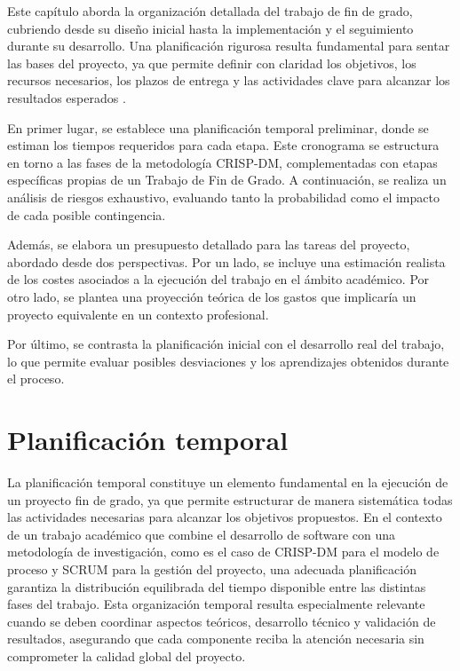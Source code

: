 Este capítulo aborda la organización detallada del trabajo de fin de grado, cubriendo desde su diseño inicial hasta la implementación y el seguimiento durante su desarrollo. Una planificación rigurosa resulta fundamental para sentar las bases del proyecto, ya que permite definir con claridad los objetivos, los recursos necesarios, los plazos de entrega y las actividades clave para alcanzar los resultados esperados \cite{pmbok}.

En primer lugar, se establece una planificación temporal preliminar, donde se estiman los tiempos requeridos para cada etapa. Este cronograma se estructura en torno a las fases de la metodología CRISP-DM, complementadas con etapas específicas propias de un Trabajo de Fin de Grado. A continuación, se realiza un análisis de riesgos exhaustivo, evaluando tanto la probabilidad como el impacto de cada posible contingencia.

Además, se elabora un presupuesto detallado para las tareas del proyecto, abordado desde dos perspectivas. Por un lado, se incluye una estimación realista de los costes asociados a la ejecución del trabajo en el ámbito académico. Por otro lado, se plantea una proyección teórica de los gastos que implicaría un proyecto equivalente en un contexto profesional.

Por último, se contrasta la planificación inicial con el desarrollo real del trabajo, lo que permite evaluar posibles desviaciones y los aprendizajes obtenidos durante el proceso.

\section{Planificación temporal}

La planificación temporal constituye un elemento fundamental en la ejecución de un proyecto fin de grado, ya que permite estructurar de manera sistemática todas las actividades necesarias para alcanzar los objetivos propuestos. En el contexto de un trabajo académico que combine el desarrollo de software con una metodología de investigación, como es el caso de CRISP-DM para el modelo de proceso y SCRUM para la gestión del proyecto, una adecuada planificación garantiza la distribución equilibrada del tiempo disponible entre las distintas fases del trabajo. Esta organización temporal resulta especialmente relevante cuando se deben coordinar aspectos teóricos, desarrollo técnico y validación de resultados, asegurando que cada componente reciba la atención necesaria sin comprometer la calidad global del proyecto.

